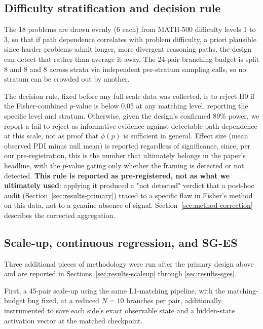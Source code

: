 \documentclass{article}
\begin{document}
\subsection{Difficulty stratification and decision rule}
\label{sec:method-strat}

The 18 problems are drawn evenly (6 each) from MATH-500 difficulty levels 1 to 3, so that if path dependence correlates with problem difficulty, a priori plausible since harder problems admit longer, more divergent reasoning paths, the design can detect that rather than average it away. The 24-pair branching budget is split 8 and 8 and 8 across strata via independent per-stratum sampling calls, so no stratum can be crowded out by another.

The decision rule, fixed before any full-scale data was collected, is to reject H0 if the Fisher-combined $p$-value is below 0.05 at any matching level, reporting the specific level and stratum. Otherwise, given the design's confirmed 89\% power, we report a fail-to-reject as informative evidence against detectable path dependence at this scale, not as proof that $\phi(p)$ is sufficient in general. Effect size (mean observed PDI minus null mean) is reported regardless of significance, since, per our pre-registration, this is the number that ultimately belongs in the paper's headline, with the $p$-value gating only whether the framing is detected or not detected. \textbf{This rule is reported as pre-registered, not as what we ultimately used}: applying it produced a "not detected" verdict that a post-hoc audit (Section~\ref{sec:results-primary}) traced to a specific flaw in Fisher's method on this data, not to a genuine absence of signal. Section~\ref{sec:method-correction} describes the corrected aggregation.

\subsection{Scale-up, continuous regression, and SG-ES}
\label{sec:method-scaleup}

Three additional pieces of methodology were run after the primary design above and are reported in Sections~\ref{sec:results-scaleup} through \ref{sec:results-sges}.

First, a 45-pair scale-up using the same L1-matching pipeline, with the matching-budget bug fixed, at a reduced $N=10$ branches per pair, additionally instrumented to save each side's exact observable state and a hidden-state activation vector at the matched checkpoint.
\end{document}
